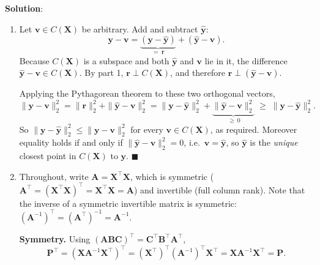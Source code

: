 \documentclass[submit]{../harvardml}
\newenvironment{solution}{
    \vspace{2mm}
    \color{blue}\noindent\textbf{Solution}:
}{}
\begin{document}
\begin{solution}
\begin{enumerate}
Together, (i) and (ii) say that $\mathbf y$ decomposes as
$\mathbf y = \hat{\mathbf y} + \mathbf r$ with $\hat{\mathbf y} \in C(\mathbf X)$
and $\mathbf r \in C(\mathbf X)^{\perp}$, which is precisely the statement that
$\hat{\mathbf y}$ is the orthogonal projection of $\mathbf y$ onto
$C(\mathbf X)$. (This decomposition is unique, since
$\mathbb{R}^N = C(\mathbf X) \oplus C(\mathbf X)^\perp$.) $\blacksquare$

\item
Let $\mathbf v \in C(\mathbf X)$ be arbitrary. Add and subtract
$\hat{\mathbf y}$:
\[
  \mathbf y - \mathbf v = \underbrace{(\mathbf y - \hat{\mathbf y})}_{=\;\mathbf r}
   + (\hat{\mathbf y} - \mathbf v).
\]
Because $C(\mathbf X)$ is a subspace and both $\hat{\mathbf y}$ and $\mathbf v$
lie in it, the difference $\hat{\mathbf y} - \mathbf v \in C(\mathbf X)$. By
part 1, $\mathbf r \perp C(\mathbf X)$, and therefore
$\mathbf r \perp (\hat{\mathbf y} - \mathbf v)$.

Applying the Pythagorean theorem to these two orthogonal vectors,
\[
  \|\mathbf y - \mathbf v\|_2^2
  = \|\mathbf r\|_2^2 + \|\hat{\mathbf y} - \mathbf v\|_2^2
  = \|\mathbf y - \hat{\mathbf y}\|_2^2 + \underbrace{\|\hat{\mathbf y} - \mathbf v\|_2^2}_{\ \geq\ 0}
  \;\geq\; \|\mathbf y - \hat{\mathbf y}\|_2^2 .
\]
So $\|\mathbf y - \hat{\mathbf y}\|_2^2 \leq \|\mathbf y - \mathbf v\|_2^2$ for
every $\mathbf v \in C(\mathbf X)$, as required. Moreover equality holds if and
only if $\|\hat{\mathbf y} - \mathbf v\|_2^2 = 0$, i.e.\ $\mathbf v =
\hat{\mathbf y}$, so $\hat{\mathbf y}$ is the \emph{unique} closest point in
$C(\mathbf X)$ to $\mathbf y$. $\blacksquare$

\item
Throughout, write $\mathbf A = \mathbf X^\top \mathbf X$, which is symmetric
($\mathbf A^\top = (\mathbf X^\top\mathbf X)^\top = \mathbf X^\top \mathbf X = \mathbf A$)
and invertible (full column rank). Note that the inverse of a symmetric
invertible matrix is symmetric:
$(\mathbf A^{-1})^\top = (\mathbf A^\top)^{-1} = \mathbf A^{-1}$.

\textbf{Symmetry.} Using $(\mathbf{ABC})^\top = \mathbf C^\top\mathbf B^\top \mathbf A^\top$,
\[
  \mathbf P^\top
  = \left(\mathbf X \mathbf A^{-1} \mathbf X^\top\right)^\top
  = (\mathbf X^\top)^\top (\mathbf A^{-1})^\top \mathbf X^\top
  = \mathbf X \mathbf A^{-1}\mathbf X^\top
  = \mathbf P .
\]


\end{enumerate}
\end{solution}
\end{document}
